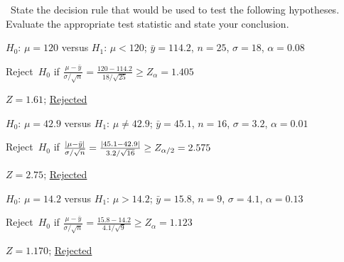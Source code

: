 \begin{problem}
  ~State the decision rule that would be used to test the following hypotheses.  Evaluate the appropriate test statistic and state your conclusion.
\end{problem}

\begin{subproblem}
  $H_0$: ${\mu = 120}$ versus $H_1$: ${\mu < 120}$; ${\bar{y} = 114.2}$, ${n = 25}$, ${\sigma = 18}$, ${\alpha = 0.08}$
\end{subproblem}

\noindent
Reject~$H_0$ if ${\frac{\mu - \bar{y}}{\sigma / \sqrt{n}} = \frac{120 - 114.2}{18 / \sqrt{25}} \geq Z_{\alpha} = 1.405}$

\noindent
${Z = 1.61}$; \underline{Rejected}

\begin{subproblem}
  $H_0$: ${\mu = 42.9}$ versus $H_1$: ${\mu \ne 42.9}$; ${\bar{y} = 45.1}$, ${n = 16}$, ${\sigma = 3.2}$, ${\alpha = 0.01}$
\end{subproblem}

\noindent
Reject~$H_0$ if ${\frac{\lvert\mu - \bar{y}\rvert}{\sigma / \sqrt{n}} = \frac{\lvert45.1 - 42.9\rvert}{3.2 / \sqrt{16}} \geq Z_{\alpha/2} = 2.575}$

\noindent
${Z = 2.75}$; \underline{Rejected}

\begin{subproblem}
  $H_0$: ${\mu = 14.2}$ versus $H_1$: ${\mu > 14.2}$; ${\bar{y} = 15.8}$, ${n = 9}$, ${\sigma = 4.1}$, ${\alpha = 0.13}$
\end{subproblem}

\noindent
Reject~$H_0$ if ${\frac{\mu - \bar{y}}{\sigma / \sqrt{n}} = \frac{15.8 - 14.2}{4.1 / \sqrt{9}} \geq Z_{\alpha} = 1.123}$

\noindent
${Z = 1.170}$; \underline{Rejected}
